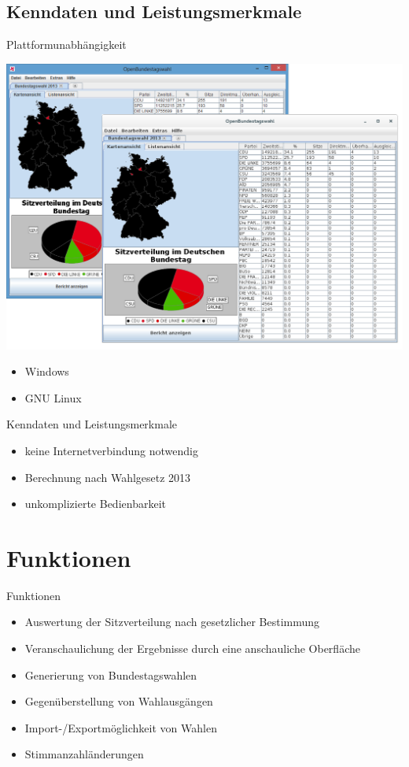\documentclass[18pt]{beamer}
\begin{document}
\subsection{Kenndaten und Leistungsmerkmale}
\begin{frame}{Plattformunabhängigkeit}
\begin{center}
	\includegraphics[scale=0.25]{img/app.png}
\end{center}
\begin{itemize}
	\item Windows
	\item GNU Linux
\end{itemize}
\end{frame}

\begin{frame}{Kenndaten und Leistungsmerkmale}
\begin{itemize}
	\item keine Internetverbindung notwendig
	\item Berechnung nach Wahlgesetz 2013
	\item unkomplizierte Bedienbarkeit
\end{itemize}
\end{frame}


\section{Funktionen}
\begin{frame}{Funktionen}
\begin{itemize}
	\item Auswertung der Sitzverteilung nach gesetzlicher Bestimmung
	\item Veranschaulichung der Ergebnisse durch eine anschauliche Oberfläche
	\item Generierung von Bundestagswahlen
	\item Gegenüberstellung von Wahlausgängen
	\item Import-/Exportmöglichkeit von Wahlen
	\item Stimmanzahländerungen
\end{itemize}
\end{frame}
\end{document}
